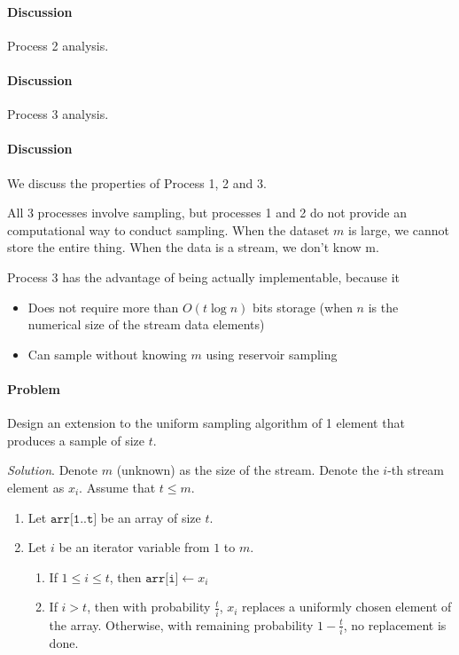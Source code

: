 \documentclass[a4paper]{article}
\begin{document}
\paragraph{Discussion} Process 2 analysis.

\paragraph{Discussion} Process 3 analysis.

\paragraph{Discussion} We discuss the properties of Process 1, 2 and 3.

All 3 processes involve sampling, but processes 1 and 2 do not provide an computational way to conduct sampling. When the dataset $m$ is large, we cannot store the entire thing. When the data is a stream, we don't know m.

Process 3 has the advantage of being actually implementable, because it
\begin{itemize}
	\item Does not require more than $O(t\log n)$ bits storage (when $n$ is the numerical size of the stream data elements)
	\item Can sample without knowing $m$ using reservoir sampling
\end{itemize}

\paragraph{Problem} Design an extension to the uniform sampling algorithm of 1 element that produces a sample of size $t$.

\textit{Solution}. Denote $m$ (unknown) as the size of the stream. Denote the $i$-th stream element as $x_i$. Assume that $t \leq m$.
\begin{enumerate}
	\item Let $\texttt{arr[1..t]}$ be an array of size $t$.
	\item Let $i$ be an iterator variable from $1$ to $m$.
	\begin{enumerate}
		\item If $1\leq i\leq t$, then $\texttt{arr[i]}\gets x_i$
		\item If $i > t$, then with probability $\frac{t}{i}$, $x_i$ replaces a uniformly chosen element of the array. Otherwise, with remaining probability $1-\frac{t}{i}$, no replacement is done.
	\end{enumerate}
\end{enumerate}
\end{document}
